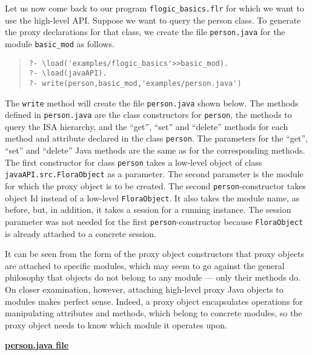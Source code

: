 Let us now come back to our program {\tt flogic\_basics.flr} for which we
want to use the high-level API.  Suppose we want to query the person class.
To generate the proxy declarations for that class, we create
the file {\tt person.java} for the 
module {\tt basic\_mod} as follows.
\begin{quote}
\begin{verbatim}
?- \load('examples/flogic_basics'>>basic_mod).
?- \load(javaAPI).
?- write(person,basic_mod,'examples/person.java')
\end{verbatim}
\end{quote}


The {\tt write} method will create the file {\tt person.java} shown
below.  The methods defined in {\tt person.java} are the class constructors
for {\tt person}, the methods to query the ISA hierarchy, and the ``get'',
``set'' and ``delete'' methods for each method and attribute declared in
the \FLSYSTEM class {\tt person}.  The parameters for the ``get'', ``set'' and
``delete'' Java methods are the same as for the corresponding \FLSYSTEM
methods. The first constructor for class {\tt person} takes a low-level
object of class {\tt javaAPI.src.FloraObject} as a
parameter. The second parameter is the \FLSYSTEM module for which the proxy
object is to be created.
The second {\tt person}-constructor takes \fl object Id instead of a
low-level {\tt FloraObject}. It also takes the module name, as before, but,
in addition, it takes a session for a running \FLSYSTEM instance.
The session parameter was not needed for the first {\tt person}-constructor
because {\tt FloraObject} is already attached to a concrete session.  

It can be seen from the form of the proxy object constructors that
proxy objects are attached to specific \FLSYSTEM modules, which may seem to
go against the general philosophy that \fl objects do not belong to any
module --- only their methods do. On closer examination, however, attaching
high-level proxy Java objects to modules makes perfect sense. Indeed, a
proxy object encapsulates operations for manipulating \fl attributes 
and methods, which belong to concrete \FLSYSTEM modules, so the proxy object
needs to know which module it operates upon.


\underline{{\bf person.java file}}

